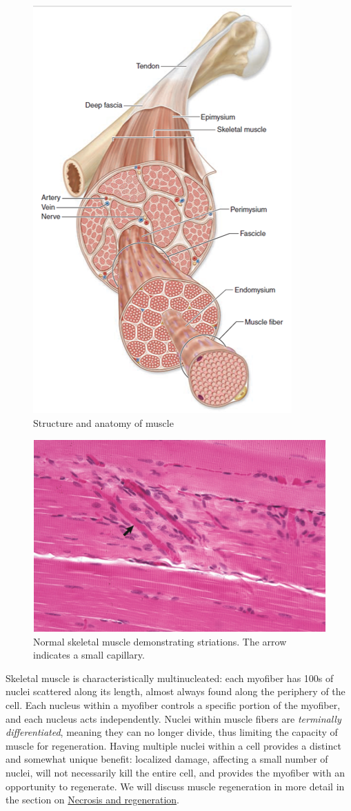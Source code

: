 \documentclass[openany]{book}
\begin{document}
\begin{figure}

{\centering \includegraphics[width=0.4\linewidth]{images/muscle_structure} 

}

\caption{Structure and anatomy of muscle}\label{fig:muscle-structure}
\end{figure}

\begin{figure}

{\centering \includegraphics[width=0.5\linewidth]{images/muscle_histo} 

}

\caption{Normal skeletal muscle demonstrating striations. The arrow indicates a small capillary.}\label{fig:muscle-histo}
\end{figure}

Skeletal muscle is characteristically multinucleated: each myofiber has
100s of nuclei scattered along its length, almost always found along the
periphery of the cell. Each nucleus within a myofiber controls a
specific portion of the myofiber, and each nucleus acts independently.
Nuclei within muscle fibers are \emph{terminally differentiated},
meaning they can no longer divide, thus limiting the capacity of muscle
for regeneration. Having multiple nuclei within a cell provides a
distinct and somewhat unique benefit: localized damage, affecting a
small number of nuclei, will not necessarily kill the entire cell, and
provides the myofiber with an opportunity to regenerate. We will discuss
muscle regeneration in more detail in the section on
\protect\hyperlink{necrosis-and-regeneration}{Necrosis and
regeneration}.
\end{document}
